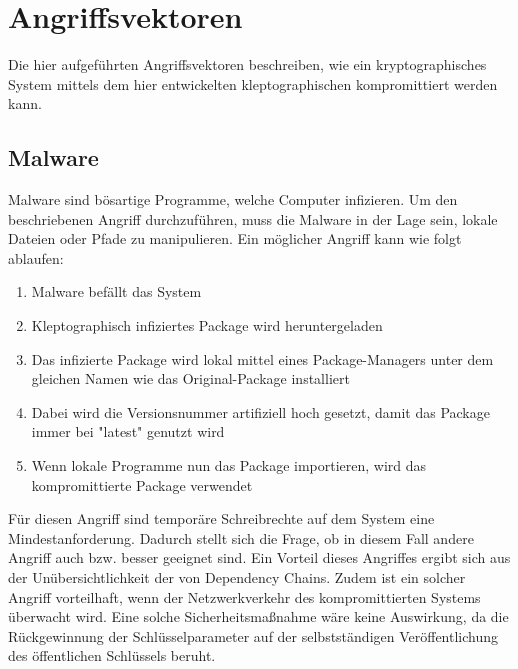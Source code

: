     \section{Angriffsvektoren}
        Die hier aufgeführten Angriffsvektoren beschreiben, wie ein kryptographisches System mittels dem hier entwickelten kleptographischen kompromittiert werden kann.

        \subsection{Malware}
            Malware sind bösartige Programme, welche Computer infizieren. Um den beschriebenen Angriff durchzuführen, muss die Malware in der Lage sein, lokale Dateien oder Pfade zu manipulieren. Ein möglicher Angriff kann wie folgt ablaufen:
            \begin{enumerate}
                \item Malware befällt das System
                \item Kleptographisch infiziertes Package wird heruntergeladen
                \item Das infizierte Package wird lokal mittel eines Package-Managers unter dem gleichen Namen wie das Original-Package installiert
                \item Dabei wird die Versionsnummer artifiziell hoch gesetzt, damit das Package immer bei "latest" genutzt wird
                \item Wenn lokale Programme nun das Package importieren, wird das kompromittierte Package verwendet
            \end{enumerate}
            Für diesen Angriff sind temporäre Schreibrechte auf dem System eine Mindestanforderung. Dadurch stellt sich die Frage, ob in diesem Fall andere Angriff auch bzw. besser geeignet sind. Ein Vorteil dieses Angriffes ergibt sich aus der Unübersichtlichkeit der von Dependency Chains. Zudem ist ein solcher Angriff vorteilhaft, wenn der Netzwerkverkehr des kompromittierten Systems überwacht wird. Eine solche Sicherheitsmaßnahme wäre keine Auswirkung, da die Rückgewinnung der Schlüsselparameter auf der selbstständigen Veröffentlichung des öffentlichen Schlüssels beruht.

